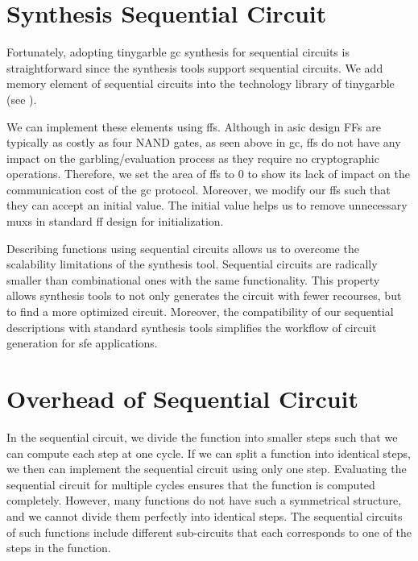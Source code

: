\section{Synthesis Sequential Circuit}\label{sec:seq-syn}
Fortunately, adopting \gls{tinygarble} \acrshort{gc} synthesis for sequential circuits is straightforward since the synthesis tools support sequential circuits.
We add memory element of sequential circuits into the technology library of \gls{tinygarble} (see ).

We can implement these elements using \acrshort{ff}s. Although in \acrshort{asic} design FFs are typically as costly as four NAND gates, as seen above in \acrshort{gc}, \acrshort{ff}s do not have any impact on the garbling/evaluation process as they require no cryptographic operations.
Therefore, we set the area of \acrshort{ff}s to 0 to show its lack of impact on the communication cost of the \acrshort{gc} protocol.
Moreover, we modify our \acrshort{ff}s such that they can accept an initial value.
The initial value helps us to remove unnecessary \acrshort{mux}s in standard \acrshort{ff} design for initialization.

Describing functions using sequential circuits allows us to overcome the scalability limitations of the synthesis tool.
Sequential circuits are radically smaller than combinational ones with the same functionality.
This property allows synthesis tools to not only generates the circuit with fewer recourses, but to find a more optimized circuit.
Moreover, the compatibility of our sequential descriptions with standard synthesis tools simplifies the workflow of circuit generation for \acrshort{sfe} applications.

\section{Overhead of Sequential Circuit}\label{sec:seq-overhead}
In the sequential circuit, we divide the function into smaller steps such that we can compute each step at one cycle.
If we can split a function into identical steps, we then can implement the sequential circuit using only one step.
Evaluating the sequential circuit for multiple cycles ensures that the function is computed completely.
However, many functions do not have such a symmetrical structure, and we cannot divide them perfectly into identical steps.
The sequential circuits of such functions include different sub-circuits that each corresponds to one of the steps in the function.

